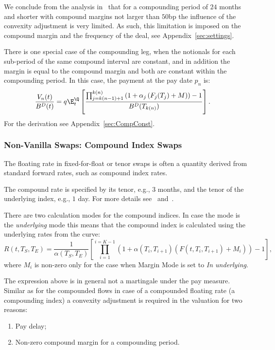 \documentclass[]{pmv_report} %
\begin{document}
We conclude from the analysis in~\cite{Quark.CompoundFunctions} that for a compounding period of $24$ months and shorter with compound margins not larger than $50$bp the influence of the convexity adjustment is very limited.
As such, this limitation is imposed on the compound margin and the frequency of the deal, see Appendix~\ref{sec:settings}.

There is one special case of the compounding leg, when the notionals for each sub-period of the same compound interval are constant, and in addition the \Libor margin is equal to the compound margin and both are constant within the compounding period.
In this case, the payment at the pay date $p_n$ is:
\begin{align*}
  \frac{V_n(t)}{B^D(t)}&=q \E_t^{\Q}
  \left[
  \frac{
  \prod_{j=k(n-1)+1}^{k(n)} \left( 1+\alpha_j \left( F_j(T_j)+M \right) \right)-1}
  {B^D(T_{k(n)})}
  \right].
  \end{align*}
For the derivation see Appendix~\ref{sec:CompConst}.

\subsubsection{Non-Vanilla Swaps: Compound Index Swaps}
The floating rate in fixed-for-float or tenor swaps is often a quantity derived from standard forward \Libor rates, such as compound index rates.

The compound rate is specified by its tenor, e.g., $3$ months, and the tenor of the underlying index, e.g., $1$ day.
For more details see~\cite{Mx.GenericFunctionalities} and~\cite{Mx.StaticDataObjects}.

There are two calculation modes for the compound indices.
In case the mode is the \textit{underlying} mode this means that the compound index is calculated using the underlying rates from the curve:
\begin{equation*}
R(t,T_S,T_{E})=\frac{1}{\alpha(T_S,T_E)} \left[ \prod_{i=1}^{i=K-1} \left(1+\alpha(T_i,T_{i+1})(F(t,T_i,T_{i+1})+M_i)\right)-1
\right],
\end{equation*}
where $M_i$ is non-zero only for the case when Margin Mode is set to \textit{In underlying}.

The expression above is in general not a martingale under the pay measure.
Similar as for the compounded flows in case of a compounded floating rate (a compounding index) a convexity adjustment is required in the valuation for two reasons:
\begin{enumerate}
  \item Pay delay;
  \item Non-zero compound margin for a compounding period.
\end{enumerate}
\end{document}
